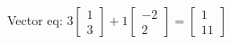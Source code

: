 \documentclass[preview]{standalone}
\begin{document}
Vector eq: $3\begin{bmatrix}1\\3\end{bmatrix}+1\begin{bmatrix}-2\\2\end{bmatrix}=\begin{bmatrix}1\\11\end{bmatrix}$\\
\end{document}
